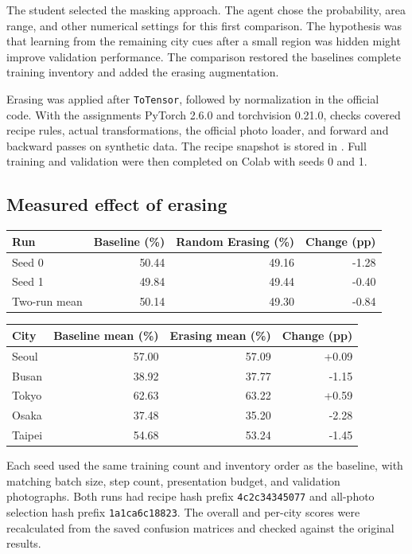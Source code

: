 \documentclass[11pt]{article}
\begin{document}
The student selected the masking approach. The agent chose the probability,
area range, and other numerical settings for this first comparison. The
hypothesis was that learning from the remaining city cues after a small
region was hidden might improve validation performance. The comparison
restored the baseline\textquotesingle{}s complete training inventory and added the erasing
augmentation.

Erasing was applied after \texttt{ToTensor}, followed by normalization in the
official code. With the assignment\textquotesingle{}s PyTorch 2.6.0 and torchvision 0.21.0,
checks covered recipe rules, actual transformations, the official photo
loader, and forward and backward passes on synthetic data. The recipe
snapshot is stored in . Full training and
validation were then completed on Colab with seeds 0 and 1.

\subsection{Measured effect of erasing}

\begin{center}\small
\begin{tabular}{lrrr}
\toprule
Run & Baseline (\%) & Random Erasing (\%) & Change (pp) \\
\midrule
Seed 0 & 50.44 & 49.16 & -1.28 \\
Seed 1 & 49.84 & 49.44 & -0.40 \\
\midrule
Two-run mean & 50.14 & 49.30 & -0.84 \\
\bottomrule
\end{tabular}
\end{center}

\begin{center}\small
\begin{tabular}{lrrr}
\toprule
City & Baseline mean (\%) & Erasing mean (\%) & Change (pp) \\
\midrule
Seoul & 57.00 & 57.09 & +0.09 \\
Busan & 38.92 & 37.77 & -1.15 \\
Tokyo & 62.63 & 63.22 & +0.59 \\
Osaka & 37.48 & 35.20 & -2.28 \\
Taipei & 54.68 & 53.24 & -1.45 \\
\bottomrule
\end{tabular}
\end{center}

Each seed used the same training count and inventory order as the baseline,
with matching batch size, step count, presentation budget, and validation
photographs. Both runs had recipe hash prefix \texttt{4c2c34345077} and
all-photo selection hash prefix \texttt{1a1ca6c18823}. The overall and per-city
scores were recalculated from the saved confusion matrices and checked
against the original results.
\end{document}
